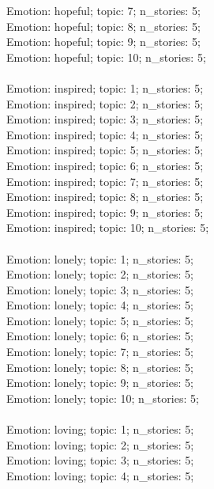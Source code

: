 \begin{anthropicbox}
    Emotion: hopeful; topic: 7; n\_stories: 5;\\
    Emotion: hopeful; topic: 8; n\_stories: 5;\\
    Emotion: hopeful; topic: 9; n\_stories: 5;\\
    Emotion: hopeful; topic: 10; n\_stories: 5;
    \\\\
    Emotion: inspired; topic: 1; n\_stories: 5;\\
    Emotion: inspired; topic: 2; n\_stories: 5;\\
    Emotion: inspired; topic: 3; n\_stories: 5;\\
    Emotion: inspired; topic: 4; n\_stories: 5;\\
    Emotion: inspired; topic: 5; n\_stories: 5;\\
    Emotion: inspired; topic: 6; n\_stories: 5;\\
    Emotion: inspired; topic: 7; n\_stories: 5;\\
    Emotion: inspired; topic: 8; n\_stories: 5;\\
    Emotion: inspired; topic: 9; n\_stories: 5;\\
    Emotion: inspired; topic: 10; n\_stories: 5;
    \\\\
    Emotion: lonely; topic: 1; n\_stories: 5;\\
    Emotion: lonely; topic: 2; n\_stories: 5;\\
    Emotion: lonely; topic: 3; n\_stories: 5;\\
    Emotion: lonely; topic: 4; n\_stories: 5;\\
    Emotion: lonely; topic: 5; n\_stories: 5;\\
    Emotion: lonely; topic: 6; n\_stories: 5;\\
    Emotion: lonely; topic: 7; n\_stories: 5;\\
    Emotion: lonely; topic: 8; n\_stories: 5;\\
    Emotion: lonely; topic: 9; n\_stories: 5;\\
    Emotion: lonely; topic: 10; n\_stories: 5;
    \\\\
    Emotion: loving; topic: 1; n\_stories: 5;\\
    Emotion: loving; topic: 2; n\_stories: 5;\\
    Emotion: loving; topic: 3; n\_stories: 5;\\
    Emotion: loving; topic: 4; n\_stories: 5;\\

\end{anthropicbox}
